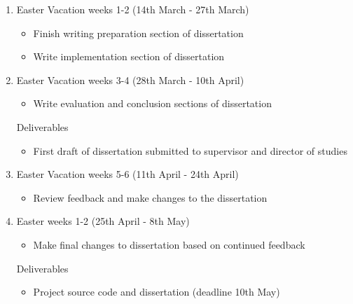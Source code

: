 \documentclass[12pt,a4paper]{article}
\begin{document}
\begin{enumerate}
    \item Easter Vacation weeks 1-2 (14th March - 27th March)
    \begin{itemize}
        \item Finish writing preparation section of dissertation
        \item Write implementation section of dissertation
    \end{itemize}

    \item Easter Vacation weeks 3-4 (28th March - 10th April)
    \begin{itemize}
        \item Write evaluation and conclusion sections of dissertation
    \end{itemize}
    Deliverables
    \begin{itemize}
        \item First draft of dissertation submitted to supervisor and director of studies
    \end{itemize}

    \item Easter Vacation weeks 5-6 (11th April - 24th April)
    \begin{itemize}
        \item Review feedback and make changes to the dissertation 
    \end{itemize}

    \item Easter weeks 1-2 (25th April - 8th May)
    \begin{itemize}
        \item Make final changes to dissertation based on continued feedback
    \end{itemize}
    Deliverables
    \begin{itemize}
        \item Project source code and dissertation (deadline 10th May)
    \end{itemize}

\end{enumerate}
\end{document}
